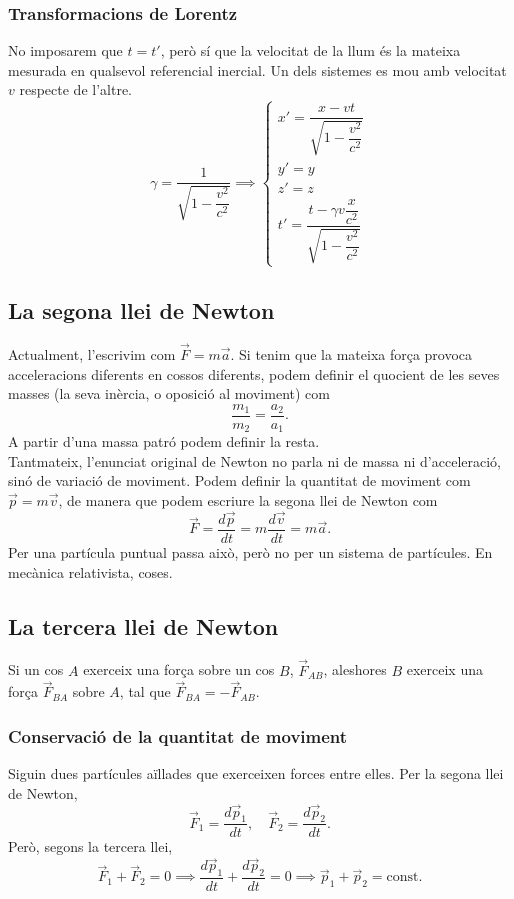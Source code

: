 \subsubsection{Transformacions de Lorentz}
No imposarem que $t=t'$, però sí que la velocitat de la llum és la mateixa mesurada en qualsevol referencial inercial. Un dels sistemes es mou amb velocitat $v$ respecte de l'altre.
\[\gamma=\dfrac{1}{\sqrt{1-\dfrac{v^2}{c^2}}}\implies\begin{cases}x'=\dfrac{x-vt}{\sqrt{1-\dfrac{v^2}{c^2}}}\\ y'=y\\ z'=z\\ t'=\dfrac{t-\gamma v\dfrac{x}{c^2}}{\sqrt{1-\dfrac{v^2}{c^2}}}\end{cases}\]

\subsection{La segona llei de Newton}
Actualment, l'escrivim com $\vec F=m\vec a$. Si tenim que la mateixa força provoca acceleracions diferents en cossos diferents, podem definir el quocient de les seves masses (la seva inèrcia, o oposició al moviment) com
\[\dfrac{m_1}{m_2}=\dfrac{a_2}{a_1}.\]
A partir d'una massa patró podem definir la resta.\\
Tantmateix, l'enunciat original de Newton no parla ni de massa ni d'acceleració, sinó de variació de moviment. Podem definir la quantitat de moviment com $\vec p=m\vec v$, de manera que podem escriure la segona llei de Newton com
\[\vec F=\dfrac{d\vec p}{dt}=m\dfrac{d\vec v}{dt}=m\vec a.\]
Per una partícula puntual passa això, però no per un sistema de partícules. En mecànica relativista, coses.

\subsection{La tercera llei de Newton}
Si un cos $A$ exerceix una força sobre un cos $B$, $\vec F_{AB}$, aleshores $B$ exerceix una força $\vec F_{BA}$ sobre $A$, tal que $\vec F_{BA}=-\vec F_{AB}$.
\subsubsection{Conservació de la quantitat de moviment}
Siguin dues partícules aïllades que exerceixen forces entre elles. Per la segona llei de Newton,
\[\vec F_1=\dfrac{d\vec p_1}{dt},\quad\vec F_2=\dfrac{d\vec p_2}{dt}.\]
Però, segons la tercera llei,
\[\vec F_1+\vec F_2=0\implies\dfrac{d\vec p_1}{dt}+\dfrac{d\vec p_2}{dt}=0\implies\vec p_1+\vec p_2=\text{const}.\]

